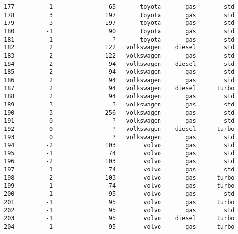\documentclass[11pt]{article}
\begin{document}
\begin{tcolorbox}[breakable, boxrule=.5pt, size=fbox, pad at break*=1mm, opacityfill=0]
\begin{Verbatim}[commandchars=\\\{\}]
177         -1                65       toyota       gas        std
178          3               197       toyota       gas        std
179          3               197       toyota       gas        std
180         -1                90       toyota       gas        std
181         -1                 ?       toyota       gas        std
182          2               122   volkswagen    diesel        std
183          2               122   volkswagen       gas        std
184          2                94   volkswagen    diesel        std
185          2                94   volkswagen       gas        std
186          2                94   volkswagen       gas        std
187          2                94   volkswagen    diesel      turbo
188          2                94   volkswagen       gas        std
189          3                 ?   volkswagen       gas        std
190          3               256   volkswagen       gas        std
191          0                 ?   volkswagen       gas        std
192          0                 ?   volkswagen    diesel      turbo
193          0                 ?   volkswagen       gas        std
194         -2               103        volvo       gas        std
195         -1                74        volvo       gas        std
196         -2               103        volvo       gas        std
197         -1                74        volvo       gas        std
198         -2               103        volvo       gas      turbo
199         -1                74        volvo       gas      turbo
200         -1                95        volvo       gas        std
201         -1                95        volvo       gas      turbo
202         -1                95        volvo       gas        std
203         -1                95        volvo    diesel      turbo
204         -1                95        volvo       gas      turbo


\end{Verbatim}
\end{tcolorbox}
\end{document}
